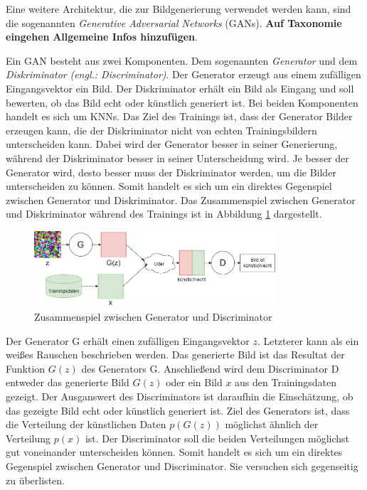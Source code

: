 \label{chap:GANs}

Eine weitere Architektur, die zur Bildgenerierung verwendet werden kann, sind die sogenannten \emph{Generative Adversarial Networks} (\acsp{GAN}). \textbf{Auf Taxonomie eingehen} \textbf{Allgemeine Infos hinzufügen}.

Ein \ac{GAN} besteht aus zwei Komponenten. Dem sogenannten \emph{Generator} und dem \emph{Diskriminator} \emph{(engl.: Discriminator)}. Der Generator erzeugt aus einem zufälligen Eingangsvektor ein Bild. Der Diskriminator erhält ein Bild als Eingang und soll bewerten, ob das Bild echt oder künstlich generiert ist. Bei beiden Komponenten handelt es sich um \acp{KNN}. Das Ziel des Trainings ist, dass der Generator Bilder erzeugen kann, die der Diskriminator nicht von echten Trainingsbildern unterscheiden kann. Dabei wird der Generator besser in seiner Generierung, während der Diskriminator besser in seiner Unterscheidung wird. Je besser der Generator wird, desto besser muss der Diskriminator werden, um die Bilder unterscheiden zu können. Somit handelt es sich um ein direktes Gegenspiel zwischen Generator und Diskriminator. Das Zusammenspiel zwischen Generator und Diskriminator während des Trainings ist in Abbildung \ref{fig:gan} dargestellt. \cite{GANs}

\begin{figure}[H]
	\centering
	\includegraphics[width=0.8\textwidth]{../images/GANs/GAN.drawio.png}
	\caption{Zusammenspiel zwischen Generator und Discriminator}
	\label{fig:gan}
\end{figure}
Der Generator G erhält einen zufälligen Eingangsvektor $z$. Letzterer kann als ein weißes Rauschen beschrieben werden. Das generierte Bild ist das Resultat der Funktion $G(z)$ des Generators G. Anschließend wird dem Discriminator D entweder das generierte Bild $G(z)$ oder ein Bild $x$ aus den Trainingsdaten gezeigt. Der Ausganswert des Discriminators ist daraufhin die Einschätzung, ob das gezeigte Bild echt oder künstlich generiert ist. Ziel des Generators ist, dass die Verteilung der künstlichen Daten $p(G(z))$ möglichst ähnlich der Verteilung $p(x)$ ist. Der Discriminator soll die beiden Verteilungen möglichst gut voneinander unterscheiden können. Somit handelt es sich um ein direktes Gegenspiel zwischen Generator und Discriminator. Sie versuchen sich gegenseitig zu überlisten.

